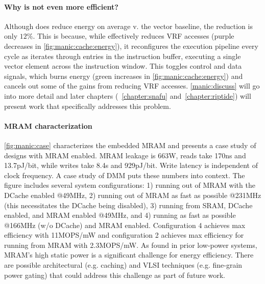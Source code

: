 \paragraph{Why is \manic not even more efficient?}
Although \manic does reduce energy on average v. the vector baseline, the reduction is only $12\%$.
% 
This is because, while \manic effectively reduces VRF accesses (purple decreases in \autoref{fig:manic:cache:energy}), it reconfigures the execution pipeline every cycle as iterates through entries in the instruction buffer, executing a single vector element across the instruction window.
% 
This toggles control and data signals, which burns energy (green increases in \autoref{fig:manic:cache:energy}) and cancels out some of the gains from reducing VRF accesses.
% 
\autoref{manic:discuss} will go into more detail and later chapters (~\autoref{chapter:snafu} and~\autoref{chapter:riptide}) will present work that specifically addresses this problem.

\figMANICMRAMCase
\paragraph{MRAM characterization}
\autoref{fig:manic:case} characterizes the embedded MRAM and presents a case study of designs with MRAM enabled.
%
MRAM leakage is 663\textmu W, reads take 170ns and 13.7pJ/bit, while writes take 8.4\textmu s and 929pJ/bit.
%
Write latency is independent of clock frequency.
%
A case study of DMM puts these numbers into context.
%
The figure includes several system configurations: 1) \manic running out of MRAM with the DCache enabled @49MHz, 2) \manic running out of MRAM as fast as possible @231MHz (this necessitates the DCache being disabled), 3) \manic running from SRAM, DCache enabled, and MRAM enabled @49MHz, and 4) \manic running as fast as possible @166MHz (w/o DCache) and MRAM enabled.
%
Configuration 4 achieves max efficiency with 11MOPS/mW %
and configuration 2 achieves max efficiency for running from MRAM with 2.3MOPS/mW.
%
As found in prior low-power systems, MRAM's high static power is a significant challenge for energy efficiency.
% 
There are possible architectural (e.g. caching) and VLSI techniques (e.g. fine-grain power gating) that could address this challenge as part of future work.
